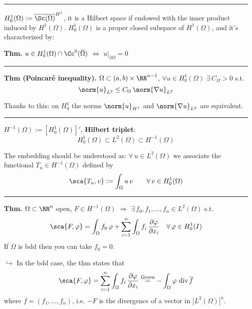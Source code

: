 \rule{0.31\textwidth}{0.2pt}
\smallskip

$H^1_0(\Omega):=\overline{\Dc(\Omega)}^{H^1}$, it is a Hilbert space if endowed with the inner product induced by $H^1(\Omega)$. $H^1_0(\Omega)$ is a proper closed subspace of $H^1(\Omega)$, and it's characterized by:

\smallskip

\textbf{Thm.} $u\in H^1_0(\Omega)\cap \Cc^0(\overline{\Omega})$ $\Longleftrightarrow$ $u\big|_{\partial \Omega}=0$

\rule{0.31\textwidth}{0.2pt}
\smallskip

\textbf{Thm (Poincaré inequality).} $\Omega\subset (a,b)\times \RR^{n-1}$, $\forall u\in H^1_0(\Omega)$ $\exists\,C_\Omega>0$ s.t.
\begin{equation*}
\norm{u}_{L^2}\leq C_\Omega\, \norm{\nabla u}_{L^2}
\end{equation*}

\smallskip

Thanks to this: on $H^1_0$ the norms $\norm{u}_{H^1}$ and $\norm{\nabla u}_{L^2}$ are equivalent.

\rule{0.31\textwidth}{0.2pt}
\smallskip

$H^{-1}(\Omega):=\left[ H^1_0(\Omega) \right]'$,  \textbf{Hilbert triplet}:
\begin{equation*}
H_0^1(\Omega)\subset L^2(\Omega) \subset H^{-1}(\Omega)
\end{equation*}

The embedding should be understood as: $\forall\, u\in L^2(\Omega)$ we associate the functional $T_u\in H^{-1}(\Omega)$ defined by
\begin{equation*}
\sca{T_u,v}:=\int_\Omega u\,v\qquad \forall\, v\in H^1_0(\Omega)
\end{equation*}

\rule{0.31\textwidth}{0.2pt}
\smallskip

\textbf{Thm.} $\Omega\subset \RR^n$ open, $F\in H^{-1}(\Omega)$ $\Longrightarrow$ $\exists\,f_0,f_1,\dots,f_n\in L^2(\Omega)$ s.t.
\begin{equation*}
\sca{F,\varphi}=\int_\Omega f_0\,\varphi+\sum_{i=1}^n \int_\Omega f_i\,\frac{\partial\varphi}{\partial x_i}\quad \forall\,\varphi\in H^1_0(I)
\end{equation*}
If $\Omega$ is bdd then you can take $f_0=0$.

\medskip

$\hookrightarrow$ In the bdd case, the thm  states that 
\begin{equation*}
\sca{F,\varphi}=\sum_{i=1}^n \int_\Omega f_i\,\frac{\partial\varphi}{\partial x_i}\overset{\text{Green}}{=}-\int_\Omega \varphi\ \text{div}\,\overline{f}
\end{equation*}
where $\overline{f}=(f_1,\dots,f_n)$, i.e. $-F$ is the divergence of a vector in $\big[L^2(\Omega)\big]^n$.

